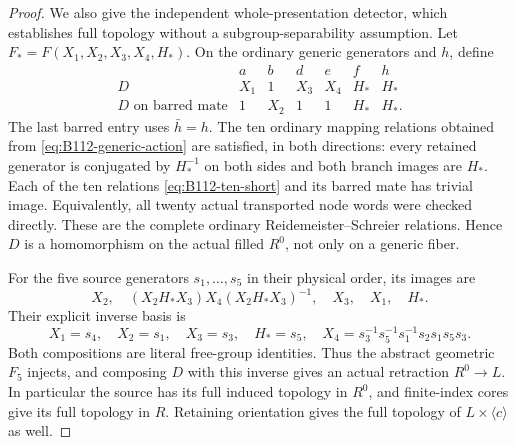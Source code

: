 \begin{proof}
We also give the independent whole-presentation detector, which
establishes full topology without a subgroup-separability assumption.
Let $F_*=F(X_1,X_2,X_3,X_4,H_*)$. On the ordinary generic
generators and $h$, define
\begin{equation}\label{eq:B112-detector}
 \begin{array}{c|cccccc}
       &a&b&d&e&f&h\\\hline
 D     &X_1&1&X_3&X_4&H_*&H_*\\
 D\text{ on barred mate}&1&X_2&1&1&H_*&H_*.
 \end{array}
\end{equation}
The last barred entry uses $\bar h=h$. The ten ordinary mapping
relations obtained from \eqref{eq:B112-generic-action} are
satisfied, in both directions: every retained generator is conjugated
by $H_*^{-1}$ on both sides and both branch images are $H_*$.
Each of the ten relations \eqref{eq:B112-ten-short} and its barred
mate has trivial image. Equivalently, all twenty actual transported
node words were checked directly. These are the complete ordinary
Reidemeister--Schreier relations. Hence $D$ is a homomorphism on
the actual filled $R^0$, not only on a generic fiber.

For the five source generators $s_1,\ldots,s_5$ in their physical
order, its images are
\[
 X_2,\quad (X_2H_*X_3)X_4(X_2H_*X_3)^{-1},\quad
 X_3,\quad X_1,\quad H_*.
\]
Their explicit inverse basis is
\[
 X_1=s_4,\quad X_2=s_1,\quad X_3=s_3,\quad H_*=s_5,
 \quad X_4=s_3^{-1}s_5^{-1}s_1^{-1}s_2s_1s_5s_3.
\]
Both compositions are literal free-group identities. Thus the
abstract geometric $F_5$ injects, and composing $D$ with this inverse
gives an actual retraction $R^0\to L$. In particular the source
has its full induced topology in $R^0$, and finite-index cores give
its full topology in $R$. Retaining orientation gives the full
topology of $L\times\langle c\rangle$ as well.


\end{proof}
